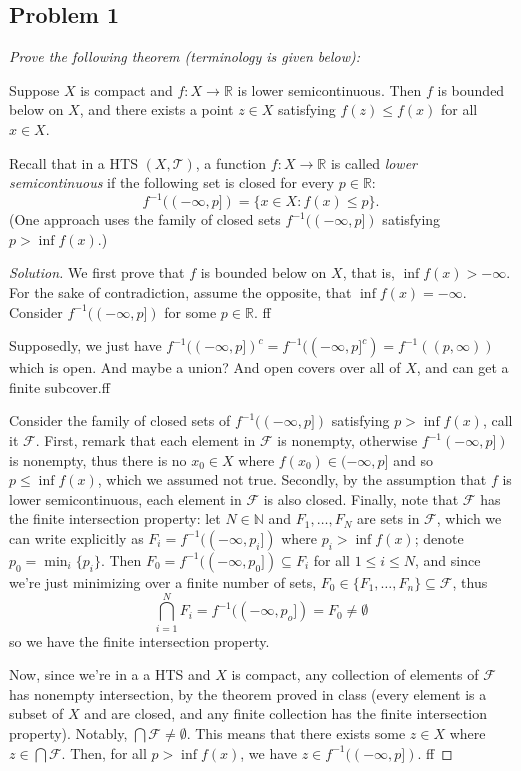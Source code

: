 \documentclass{article}
\newcommand{\N}{{\mathbb N}}
\newcommand{\R}{{\mathbb R}}
\begin{document}
\subsection*{Problem 1}
{\it Prove the following theorem (terminology is given below):
\begin{center}
	Suppose $X$ is compact and $f \colon X \to \R$ is lower semicontinuous.
	Then $f$ is bounded below on $X$,
	and there exists a point $z \in X$ satisfying $f(z) \leq f(x)$ for all $x \in X$.
\end{center}
Recall that in a HTS $(X, \mathcal{T})$, a function $f \colon X \to \R$
is called \emph{lower semicontinuous} if the following set
is closed for every $p \in \R$:
\[
	f^{-1}((-\infty,p]) = \{x \in X \colon f(x) \leq p \}.
\]
(One approach uses the family of closed sets
$f^{-1}((-\infty,p])$ satisfying $p > \inf f(x)$.)}

\begin{proof}[Solution]\let\qed\relax
	We first prove that $f$ is bounded below on $X$,
	that is, $\inf{f(x)} > -\infty$.
	For the sake of contradiction, assume the opposite, that $\inf{f(x)} = -\infty$.
	Consider $f^{-1}((-\infty, p])$ for some $p \in \R$.
	ff

	Supposedly, we just have $f^{-1}((-\infty,p])^c = f^{-1}((-\infty,p]^c) = f^{-1}((p,\infty))$
	which is open.
	And maybe a union?
	And open covers over all of $X$, and can get a finite subcover.ff

	Consider the family of closed sets of $f^{-1}((-\infty,p])$
	satisfying $p > \inf{f(x)}$, call it $\mathcal{F}$.
	First, remark that each element in $\mathcal{F}$ is nonempty,
	otherwise $f^{-1}(-\infty,p])$ is nonempty,
	thus there is no $x_0 \in X$ where $f(x_0) \in (-\infty,p]$
	and so $p \leq \inf{f(x)}$, which we assumed not true.
	Secondly, by the assumption that $f$ is lower semicontinuous,
	each element in $\mathcal{F}$ is also closed.
	Finally, note that $\mathcal{F}$ has the finite intersection property:
	let $N \in \N$ and $F_1, \dots, F_N$ are sets in $\mathcal{F}$,
	which we can write explicitly as $F_i = f^{-1}((-\infty, p_i])$
	where $p_i > \inf{f(x)}$;
	denote $p_0 = \min_i\{p_i\}$.
	Then $F_0 = f^{-1}((-\infty, p_0]) \subseteq F_i$ for all $1 \leq i \leq N$,
	and since we're just minimizing over a finite number of sets,
	$F_0 \in \{F_1,\dots,F_n\} \subseteq \mathcal{F}$, thus
	\[
		\bigcap_{i=1}^N F_i = f^{-1}((-\infty,p_o]) = F_0 \neq \emptyset
	\]
	so we have the finite intersection property.

	Now, since we're in a a HTS and $X$ is compact,
	any collection of elements of $\mathcal{F}$ has nonempty intersection,
	by the theorem proved in class
	(every element is a subset of $X$ and are closed,
	and any finite collection has the finite intersection property).
	Notably, $\bigcap \mathcal{F} \neq \emptyset$.
	This means that there exists some $z \in X$ where $z \in \bigcap\mathcal{F}$.
	Then, for all $p > \inf{f(x)}$, we have $z \in f^{-1}((-\infty,p])$.
	ff
\end{proof}
\clearpage
~\clearpage
\end{document}
